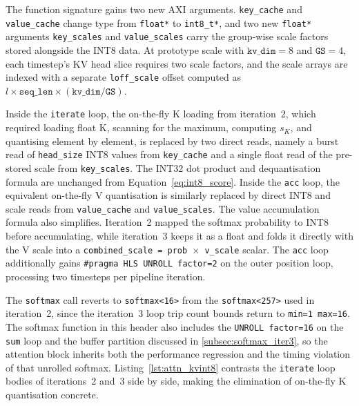 The function signature gains two new AXI arguments. \texttt{key\_cache}
and \texttt{value\_cache} change type from \texttt{float*} to
\texttt{int8\_t*}, and two new \texttt{float*} arguments
\texttt{key\_scales} and \texttt{value\_scales} carry the group-wise
scale factors stored alongside the INT8 data. At prototype scale with
$\texttt{kv\_dim} = 8$ and $\texttt{GS} = 4$, each timestep's KV head
slice requires two scale factors, and the scale arrays are indexed with
a separate \texttt{loff\_scale} offset computed as $l \times
\texttt{seq\_len} \times (\texttt{kv\_dim}/\texttt{GS})$.

Inside the \texttt{iterate} loop, the on-the-fly K loading from iteration~2,
which required loading float K, scanning for the maximum, computing
$s_K$, and quantising element by element, is replaced by two direct
reads, namely a burst read of \texttt{head\_size} INT8 values from
\texttt{key\_cache} and a single float read of the pre-stored scale from
\texttt{key\_scales}. The INT32 dot product and dequantisation formula
are unchanged from Equation~\ref{eq:int8_score}. Inside the \texttt{acc}
loop, the equivalent on-the-fly V quantisation is similarly replaced by
direct INT8 and scale reads from \texttt{value\_cache} and
\texttt{value\_scales}. The value accumulation formula also simplifies.
Iteration~2 mapped the softmax probability to INT8 before accumulating,
while iteration~3 keeps it as a float and folds it directly with the
V scale into a \texttt{combined\_scale = prob\,$\times$\,v\_scale}
scalar. The \texttt{acc} loop additionally gains
\texttt{\#pragma HLS UNROLL factor=2} on the outer position loop, processing
two timesteps per pipeline iteration.

The \texttt{softmax} call reverts to \texttt{softmax<16>} from the
\texttt{softmax<257>} used in iteration~2, since the iteration~3 loop
trip count bounds return to \texttt{min=1 max=16}. The softmax function
in this header also includes the \texttt{UNROLL factor=16} on the
\texttt{sum} loop and the buffer partition discussed in
\cref{subsec:softmax_iter3}, so the attention block inherits both the
performance regression and the timing violation of that unrolled softmax.
Listing~\ref{lst:attn_kvint8} contrasts the \texttt{iterate} loop bodies
of iterations~2 and~3 side by side, making the elimination of on-the-fly
K quantisation concrete.

